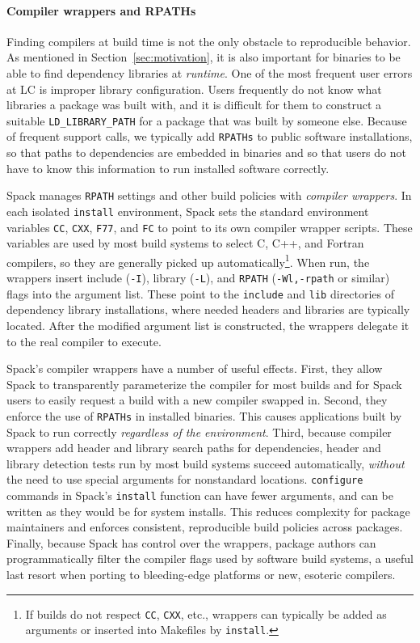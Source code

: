 \paragraph{Compiler wrappers and RPATHs}
Finding compilers at build time is not the only obstacle to reproducible
behavior.  As mentioned in Section~\ref{sec:motivation}, it is also important
for binaries to be able to find dependency libraries at {\it runtime}.
One of the most frequent user errors at LC is improper library configuration.
Users frequently do not know what libraries a package was built with, and 
it is difficult for them to construct a suitable {\tt LD\_LIBRARY\_PATH} for
a package that was built by someone else.  Because of frequent support calls,
we typically add {\tt RPATHs} to public software installations, so that paths
to dependencies are embedded in binaries and so that users do not have to know
this information to run installed software correctly.

Spack manages {\tt RPATH} settings and other build policies with
{\it compiler wrappers}. 
In each isolated {\tt install} environment, Spack sets the standard 
environment variables
{\tt CC}, {\tt CXX}, {\tt F77}, and {\tt FC} to point to its own compiler
wrapper scripts.  These variables are used by most build systems to select
C, C++, and Fortran compilers, so they are generally picked up 
automatically\footnote{If builds do not respect {\tt CC}, {\tt CXX}, etc.,
wrappers can typically be added as arguments or inserted into Makefiles
by {\tt install}.}.
When run, the wrappers insert include ({\tt -I}), library ({\tt -L}), and 
{\tt RPATH} ({\tt -Wl,-rpath} or similar) flags into the argument list.
These point to the {\tt include} and {\tt lib} directories of dependency
library installations, where needed headers and libraries are typically located.
After the modified argument list is constructed, the wrappers delegate it
to the real compiler to execute.

Spack's compiler wrappers have a number of useful effects.  First, they allow
Spack to transparently parameterize the compiler for most builds and for
Spack users to easily request a build with a new compiler swapped in.
Second, they enforce the use of {\tt RPATHs} in
installed binaries.  This causes applications built by Spack to run correctly
{\it regardless of the environment}.  Third, because compiler wrappers add 
header and library search paths for dependencies, header and library detection
tests run by most build systems succeed automatically, {\it without}
the need to use special arguments for nonstandard locations.  {\tt configure}
commands in Spack's {\tt install} function can have fewer arguments, and can
be written as they would be for system installs.  This reduces complexity
for package maintainers and enforces consistent, reproducible
build policies across packages.  Finally, because Spack has control over the 
wrappers, package authors can programmatically filter the compiler flags
used by software build systems, a useful last resort when porting to
bleeding-edge platforms or new, esoteric compilers.

